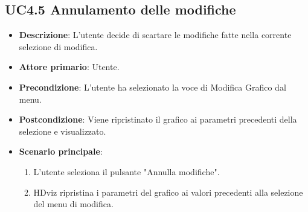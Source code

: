 \subsection{UC4.5 Annulamento delle modifiche}

\begin{itemize}
    \item \textbf{Descrizione}: L'utente decide di scartare le modifiche fatte nella corrente selezione di modifica.

    \item \textbf{Attore primario}: Utente.
    
    \item \textbf{Precondizione}:   L'utente ha selezionato la voce di Modifica Grafico dal menu.
    \item \textbf{Postcondizione}:  Viene ripristinato il grafico ai parametri precedenti della selezione e visualizzato.

	\item \textbf{Scenario principale}:
        \begin{enumerate}

            \item L'utente seleziona il pulsante "Annulla modifiche".
            \item HDviz ripristina i parametri del grafico ai valori precedenti alla selezione del menu di modifica.
        
        \end{enumerate}
\end{itemize}



